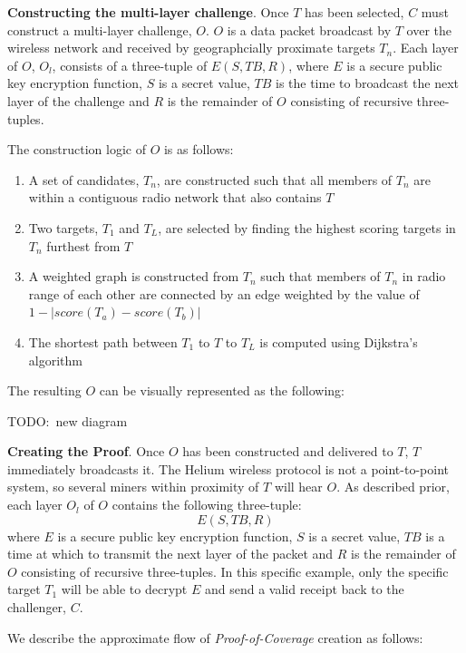 \documentclass[letterpaper,11pt]{article}
\newcommand{\todo}[1]{}
\renewcommand{\todo}[1]{{\color{red} TODO:\ {#1}}}
\begin{document}
\textbf{Constructing the multi-layer challenge}. Once $T$ has been selected, $C$ must construct a multi-layer challenge, $O$. $O$ is a data packet broadcast by $T$ over the wireless network and received by geographcially proximate targets $T_n$. Each layer of $O$, $O_l$, consists of a three-tuple of $E\left(S, TB, R\right)$, where $E$ is a secure public key encryption function, $S$ is a secret value, $TB$ is the time to broadcast the next layer of the challenge and $R$ is the remainder of $O$ consisting of recursive three-tuples.

The construction logic of $O$ is as follows:

\begin{enumerate}
  \item A set of candidates, $T_n$, are constructed such that all members of $T_n$ are within a contiguous radio network that also contains $T$
  \item Two targets, $T_1$ and $T_L$, are selected by finding the highest scoring targets in $T_n$ furthest from $T$
  \item A weighted graph is constructed from $T_n$ such that members of $T_n$ in radio range of each other are connected by an edge weighted by the value of \(1 - |{score(T_a) - score(T_b)}|\)
  \item The shortest path between $T_1$ to $T$ to $T_L$ is computed using Dijkstra's algorithm\cite{dijkstra}
\end{enumerate}

The resulting $O$ can be visually represented as the following:

\todo{new diagram}

\textbf{Creating the Proof}. Once $O$ has been constructed and delivered to $T$, $T$ immediately broadcasts it. The Helium wireless protocol is not a point-to-point system, so several miners within proximity of $T$ will hear $O$. As described prior, each layer $O_l$ of $O$ contains the following three-tuple: \[\mathit{E\left(S, TB, R\right)}\] where $E$ is a secure public key encryption function, $S$ is a secret value, $TB$ is a time at which to transmit the next layer of the packet and $R$ is the remainder of $O$ consisting of recursive three-tuples. In this specific example, only the specific target $T_1$ will be able to decrypt $E$ and send a valid receipt back to the challenger, $C$.

We describe the approximate flow of \emph{Proof-of-Coverage} creation as follows:
\end{document}
